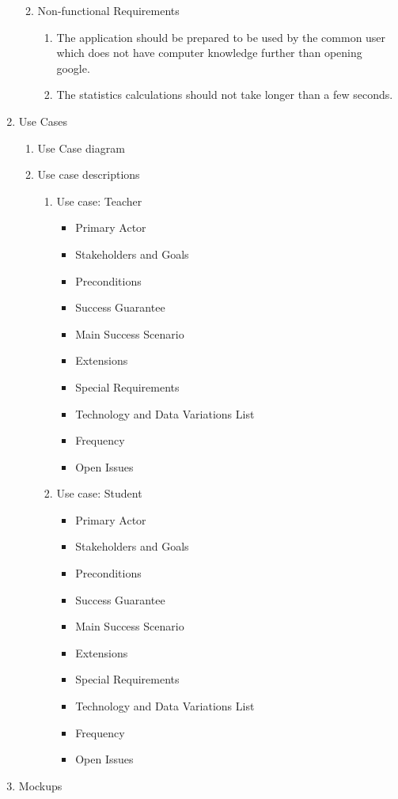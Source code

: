 \documentclass{article}
\begin{document}
\begin{enumerate}
\begin{enumerate}
\begin{enumerate}
\begin{enumerate}
				 
			\end{enumerate}
		\end{enumerate}
		\item{Non-functional Requirements}
			\begin{enumerate}
				\item The application should be prepared to be used by the common user which does not have computer knowledge further than opening google.
				\item The statistics calculations should not take longer than a few seconds.
			\end{enumerate}
	\end{enumerate}
	\item{Use Cases}
	\begin{enumerate}
		\item{Use Case diagram}
		\item{Use case descriptions}
		\begin{enumerate}
			\item{Use case: Teacher}
			\begin{itemize}
				\item Primary Actor
				\item Stakeholders and Goals
				\item Preconditions
				\item Success Guarantee
				\item Main Success Scenario
				\item Extensions
				\item Special Requirements
				\item Technology and Data Variations List
				\item Frequency
				\item Open Issues
			\end{itemize}
			\item{Use case: Student}
			
			
			
			\begin{itemize}
				\item Primary Actor
				\item Stakeholders and Goals
				\item Preconditions
				\item Success Guarantee
				\item Main Success Scenario
				\item Extensions
				\item Special Requirements
				\item Technology and Data Variations List
				\item Frequency
				\item Open Issues
				
			\end{itemize}
		\end{enumerate}
	\end{enumerate}
	\item{Mockups}
	

\end{enumerate}
\end{document}
